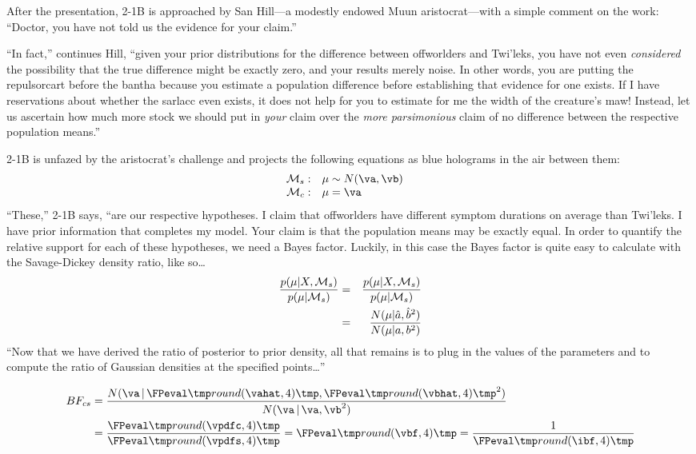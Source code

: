After the presentation, 2-1B is approached by San Hill---a modestly endowed Muun aristocrat---with a simple comment on the work: ``Doctor, you have not told us the evidence for your claim.''

``In fact,'' continues Hill, ``given your prior distributions for the difference between offworlders and Twi'leks, you have not even \emph{considered} the possibility that the true difference might be exactly zero, and your results merely noise. In other words, you are putting the repulsorcart before the bantha because you estimate a population difference before establishing that {evidence for} one exists. If I have reservations about whether the sarlacc even exists, it does not help for you to estimate for me the width of the creature's maw! Instead, let us ascertain how much more stock we should put in \textit{your} claim over the \textit{more parsimonious} claim of no difference between the respective population means.''

2-1B is unfazed by the aristocrat's challenge and projects the following equations as blue holograms in the air between them:
$$\begin{array}{rll}
  \H_s: & \mu \sim N(\va, \vb) & \\
  \H_c: & \mu   =  \va         & 
\end{array}$$
``These,'' 2-1B says, ``are our respective hypotheses. I claim that offworlders have different symptom durations on average than Twi'leks. I have prior information that completes my model. Your claim is that the population means may be exactly equal. In order to quantify the relative support for each of these hypotheses, we need a Bayes factor. Luckily, in this case the Bayes factor is quite easy to calculate with the Savage-Dickey density ratio, like so\dots
\begin{eqnarray*}
\frac{p(\mu| X, {\cal M}_s)}{p(\mu|{\cal M}_s)}
   &=& \frac{p(\mu| X,{\cal M}_s)}{p(\mu|{\cal M}_s)} \\
   &=& \frac{N(\mu| \hat{a}, \hat{b}^2)}{N(\mu|a,b^2)}
\end{eqnarray*}
``Now that we have derived the ratio of posterior to prior density, all that remains is to plug in the values of the parameters and to compute the ratio of Gaussian densities at the specified points\dots''

\begin{align*}
  BF_{cs} &=  \frac{N(\va \,|\, \print{\vahat}, \print{\vbhat}^2)}{N(\va \,|\, \va, \vb^2)}\\
          &=  \frac{\print{\vpdfc}}{\print{\vpdfs}} = \print{\vbf} = \frac{1}{\print{\ibf}}
\end{align*}

